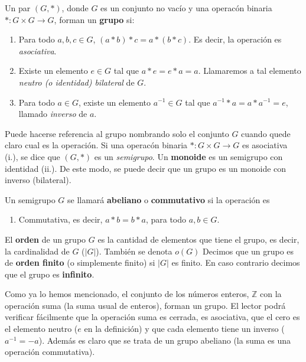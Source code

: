 \documentclass[12pt,]{krantz}
\providecommand{\tightlist}{%
  \setlength{\itemsep}{0pt}\setlength{\parskip}{0pt}}
\theoremstyle{definition}
\theoremstyle{definition}
\theoremstyle{definition}
\theoremstyle{remark}
\let\BeginKnitrBlock\begin \let\EndKnitrBlock\end
\begin{document}
\BeginKnitrBlock{definition}
\protect\hypertarget{def:unnamed-chunk-48}{}{\label{def:unnamed-chunk-48}
}Un par \((G,\ast)\), donde \(G\) es un conjunto no vacío y una operacón
binaria \(\ast:G\times G\longrightarrow G\), forman un \textbf{grupo}
si:

\begin{enumerate}
\def\labelenumi{\roman{enumi})}
\item
  Para todo \(a,b,c\in G\), \((a\ast b)\ast c=a\ast (b\ast c)\). Es
  decir, la operación es \emph{asociativa}.
\item
  Existe un elemento \(e\in G\) tal que \(a\ast e=e\ast a=a\).
  Llamaremos a tal elemento \emph{neutro (o identidad) bilateral} de
  \(G\).
\item
  Para todo \(a\in G\), existe un elemento \(a^{-1}\in G\) tal que
  \(a^{-1}\ast a=a\ast a^{-1}=e\), llamado \emph{inverso} de \(a\).
\end{enumerate}
\EndKnitrBlock{definition}

\BeginKnitrBlock{remark}
{}Puede hacerse referencia al grupo nombrando
solo el conjunto \(G\) cuando quede claro cual es la operación. Si una
operacón binaria \(\ast:G\times G\longrightarrow G\) es asociativa (i.),
se dice que \((G,\ast)\) es un \emph{semigrupo}. Un \textbf{monoide} es
un semigrupo con identidad (ii.). De este modo, se puede decir que un
grupo es un monoide con inverso (bilateral).
\EndKnitrBlock{remark}

Un semigrupo \(G\) se llamará \textbf{abeliano} o \textbf{commutativo}
si la operación es

\begin{enumerate}
\def\labelenumi{\roman{enumi})}
\setcounter{enumi}{3}
\tightlist
\item
  Commutativa, es decir, \(a*b=b*a\), para todo \(a, b\in G\).
\end{enumerate}

El \textbf{orden} de un grupo \(G\) es la cantidad de elementos que
tiene el grupo, es decir, la cardinalidad de \(G\) (\(|G|\)). También se
denota \(o(G)\) Decimos que un grupo es de \textbf{orden finito} (o
simplemente finito) si \(|G|\) es finito. En caso contrario decimos que
el grupo es \textbf{infinito}.

\BeginKnitrBlock{example}
\protect\hypertarget{exm:unnamed-chunk-50}{}{\label{exm:unnamed-chunk-50}
}Como ya lo hemos mencionado, el conjunto de los números enteros,
\(\mathbb{Z}\) con la operación suma (la suma usual de enteros), forman
un grupo. El lector podrá verificar fácilmente que la operación suma es
cerrada, es asociativa, que el cero es el elemento neutro (\(e\) en la
definición) y que cada elemento tiene un inverso (\(a^{-1}=-a\)). Además
es claro que se trata de un grupo abeliano (la suma es una operación
commutativa).
\EndKnitrBlock{example}
\end{document}
